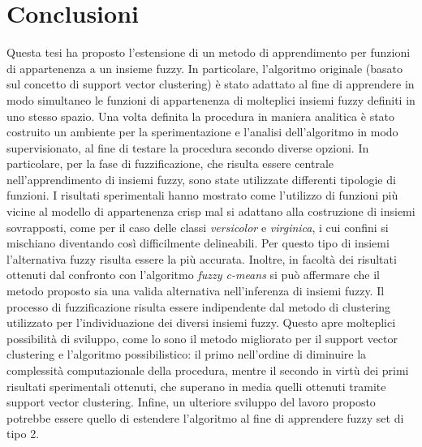 \documentclass [11pt,a4paper,twoside,openright] {book}
\begin{document}
\chapter*{Conclusioni}
Questa tesi ha proposto l'estensione di un metodo di apprendimento per funzioni di appartenenza a un insieme fuzzy. In particolare, l'algoritmo originale (basato sul concetto di support vector clustering) è stato adattato al fine di apprendere in modo simultaneo le funzioni di appartenenza di molteplici insiemi fuzzy definiti in uno stesso spazio. Una volta definita la procedura in maniera analitica è stato costruito un ambiente per la sperimentazione e l'analisi dell'algoritmo in modo supervisionato, al fine di testare la procedura secondo diverse opzioni. In particolare, per la fase di fuzzificazione, che risulta essere centrale nell'apprendimento di insiemi fuzzy, sono state utilizzate differenti tipologie di funzioni. I risultati sperimentali hanno mostrato come l'utilizzo di funzioni più vicine al modello di appartenenza crisp mal si adattano alla costruzione di insiemi sovrapposti, come per il caso delle classi \textit{versicolor} e \textit{virginica}, i cui confini si mischiano diventando così difficilmente delineabili. Per questo tipo di insiemi l'alternativa fuzzy risulta essere la più accurata. Inoltre, in facoltà dei risultati ottenuti dal confronto con l'algoritmo \textit{fuzzy c-means} si può affermare che il metodo proposto sia una valida alternativa nell'inferenza di insiemi fuzzy. Il processo di fuzzificazione risulta essere indipendente dal metodo di clustering utilizzato per l'individuazione dei diversi insiemi fuzzy. Questo apre molteplici possibilità di sviluppo, come lo sono il metodo migliorato per il support vector clustering e l'algoritmo possibilistico: il primo nell'ordine di diminuire la complessità computazionale della procedura,  mentre il secondo in virtù dei primi risultati sperimentali ottenuti, che superano in media quelli ottenuti tramite support vector clustering. Infine, un ulteriore sviluppo del lavoro proposto potrebbe essere quello di estendere l'algoritmo al fine di apprendere fuzzy set di tipo 2.


\end{document}
